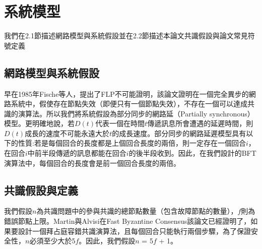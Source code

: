\chapter{系統模型}\label{se_2}
我們在2.1節描述網路模型與系統假設並在2.2節描述本論文共識假設與論文常見符號定義
\section{網路模型與系統假設}\label{se_2} 

早在1985年Fische等人，提出了FLP不可能證明\cite{fischer1982impossibility}，該論文證明在一個完全異步的網路系統中，假使存在節點失效（即便只有一個節點失效），不存在一個可以達成共識的演算法。所以我們將系統假設為部分同步的網路延（Partially synchronous）模型。更明確地說，若$D(t)$代表一個在時間$t$傳遞訊息所會遭遇的延遲時間，則$D(t)$成長的速度不可能永遠大於$t$的成長速度。部分同步的網路延遲模型具有以下的性質:若是每個回合的長度都是上個回合長度的兩倍，則一定存在一個回合$i$，在回合$i$中前半段傳遞的訊息都能在回合$i$的後半段收到。因此，在我們設計的BFT演算法中，每個回合的長度會是前一個回合長度的兩倍。

\section{共識假設與定義}\label{se_2} 

我們假設$n$為共識問題中的參與共識的總節點數量（包含故障節點的數量），$f$則為錯誤節點上限。Martin與Alvisi在Fast Byzantine Consensus該論文\cite{martin2006fast}已經證明了，如果要設計一個拜占庭容錯共識演算法，且每個回合只能執行兩個步驟，為了保證安全性，$n$必須至少大於5$f$。因此，我們假設$n$ = 5$f$ + 1。

